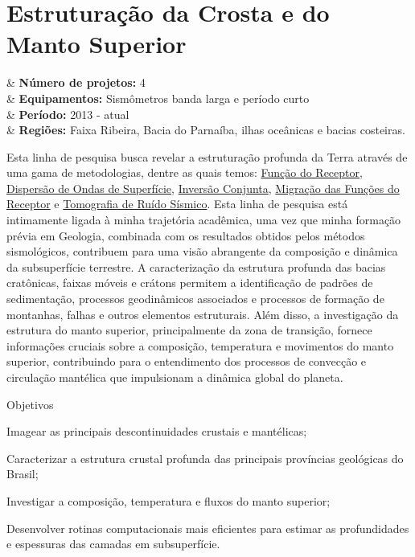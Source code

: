 \documentclass[10pt,a4paper,oneside]{book}
\begin{document}
\section{Estruturação da Crosta e do Manto Superior}

\begin{summarybox}[frametitle=\faProjectDiagram{}\quad Panorama da linha de pesquisa]
	\begin{datelist}
		\faFile* & \textbf{Número de projetos:} 4 \\
		\faBinoculars & \textbf{Equipamentos:} Sismômetros banda larga e período curto \\
		\faCalendar*[regular] & \textbf{Período:} 2013 - atual \\
		\faMapMarked* & \textbf{Regiões:} Faixa Ribeira, Bacia do Parnaíba, ilhas oceânicas e bacias costeiras. \\
	\end{datelist}
\end{summarybox}

\bigskip

Esta linha de pesquisa busca revelar a estruturação profunda da Terra através de uma gama de metodologias, dentre as quais temos: \href{https://doi.org/10.1029/JB084iB09p04749}{Função do Receptor}, \href{https://doi.org/10.1111/j.1365-246X.1990.tb04573.x}{Dispersão de Ondas de Superfície}, \href{https://doi.org/10.1046/j.1365-246x.2000.00217.x}{Inversão Conjunta}, \href{https://doi.org/10.1016/j.epsl.2013.08.025}{Migração das Funções do Receptor} e \href{https://doi.org/10.1111/j.1365-246X.2007.03374.x}{Tomografia de Ruído Sísmico}. Esta linha de pesquisa está intimamente ligada à minha trajetória acadêmica, uma vez que minha formação prévia em Geologia, combinada com os resultados obtidos pelos métodos sismológicos, contribuem para uma visão abrangente da composição e dinâmica da subsuperfície terrestre. A caracterização da estrutura profunda das bacias cratônicas, faixas móveis e crátons permitem a identificação de padrões de sedimentação, processos geodinâmicos associados e processos de formação de montanhas, falhas e outros elementos estruturais. Além disso, a investigação da estrutura do manto superior, principalmente da zona de transição, fornece informações cruciais sobre a composição, temperatura e movimentos do manto superior, contribuindo para o entendimento dos processos de convecção e circulação mantélica que impulsionam a dinâmica global do planeta.  

\begin{fancyenum}{\faFutbol}{Objetivos}
	\item Imagear as principais descontinuidades crustais e mantélicas;
	\item Caracterizar a estrutura crustal profunda das principais províncias geológicas do Brasil;
	\item Investigar a composição, temperatura e fluxos do manto superior;
	\item Desenvolver rotinas computacionais mais eficientes para estimar as profundidades e espessuras das camadas em subsuperfície.
\end{fancyenum}
\end{document}
